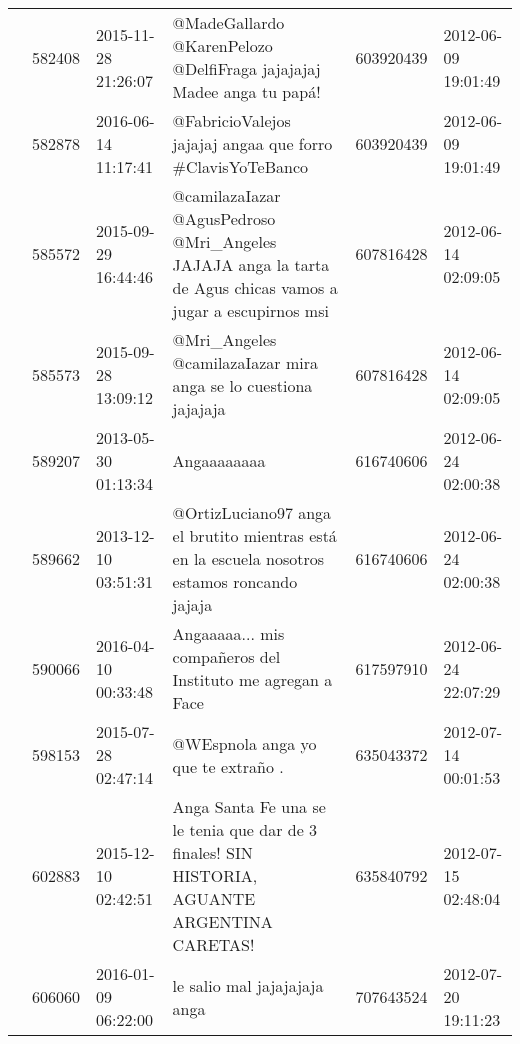 \begin{tabular}{llllrl}
           & 582408  & 2015-11-28 21:26:07 &                                                                         @MadeGallardo @KarenPelozo @DelfiFraga jajajajaj Madee anga tu papá! &   603920439 & 2012-06-09 19:01:49 \\
           & 582878  & 2016-06-14 11:17:41 &                                                                                    @FabricioValejos jajajaj angaa que forro \#ClavisYoTeBanco &   603920439 & 2012-06-09 19:01:49 \\
           & 585572  & 2015-09-29 16:44:46 &                                  @camilazaIazar @AgusPedroso @Mri\_Angeles JAJAJA anga la tarta de Agus chicas vamos a jugar a escupirnos msi &   607816428 & 2012-06-14 02:09:05 \\
           & 585573  & 2015-09-28 13:09:12 &                                                                               @Mri\_Angeles @camilazaIazar mira anga se lo cuestiona jajajaja &   607816428 & 2012-06-14 02:09:05 \\
           & 589207  & 2013-05-30 01:13:34 &                                                                                                                                  Angaaaaaaaa &   616740606 & 2012-06-24 02:00:38 \\
           & 589662  & 2013-12-10 03:51:31 &                                                 @OrtizLuciano97 anga el brutito mientras está en la escuela nosotros estamos roncando jajaja &   616740606 & 2012-06-24 02:00:38 \\
           & 590066  & 2016-04-10 00:33:48 &                                                                                   Angaaaaa... mis compañeros del Instituto me agregan a Face &   617597910 & 2012-06-24 22:07:29 \\
           & 598153  & 2015-07-28 02:47:14 &                                                                                                           @WEspnola anga yo que te extraño . &   635043372 & 2012-07-14 00:01:53 \\
           & 602883  & 2015-12-10 02:42:51 &                                                 Anga Santa Fe una se le tenia que dar de 3 finales! SIN HISTORIA, AGUANTE ARGENTINA CARETAS! &   635840792 & 2012-07-15 02:48:04 \\
           & 606060  & 2016-01-09 06:22:00 &                                                                                                                 le salio mal jajajajaja anga &   707643524 & 2012-07-20 19:11:23 \\

\end{tabular}
